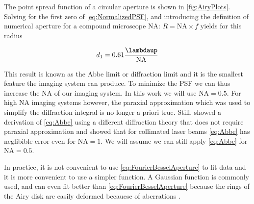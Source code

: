 The point spread function of a circular aperture is shown in \cref{fig:AiryPlots}. 
Solving for the first zero of \cref{eq:NormalizedPSF}, and introducing the definition of numerical aperture for a compound microscope \ac{NA}: $R = \text{NA} \times f$ yields for this radius 

\begin{equation}\label{eq:Abbe}
    d_1 = 0.61 \frac{\lambdaup}{\text{NA}}
\end{equation}

This result is known as the Abbe limit or diffraction limit \cite{Abbe1882} and it is the smallest feature the imaging system can produce. 
To minimize the \ac{PSF} we can thus increase the \ac{NA} of our imaging system. In this work we will use $\text{NA} = 0.5$. 
For high NA imaging systems however, the paraxial approximation which was used to simplify the diffraction integral is no longer a priori true. 
Still, \cite{Chon2007} showed a derivation of \cref{eq:Abbe} using a different diffraction theory that does not require paraxial approximation and showed that for collimated laser beams \cref{eq:Abbe} has neglibible error even for $\text{NA} = 1$. 
We will assume we can still apply \cref{eq:Abbe} for $\text{NA} = 0.5$.

In practice, it is not convenient to use \cref{eq:FourierBesselAperture} to fit data and it is more convenient to use a simpler function. 
A Gaussian function is commonly used, and can even fit better than \cref{eq:FourierBesselAperture} because the rings of the Airy disk are easily deformed becauese of aberrations \cite{Knottnerus2018}. 


